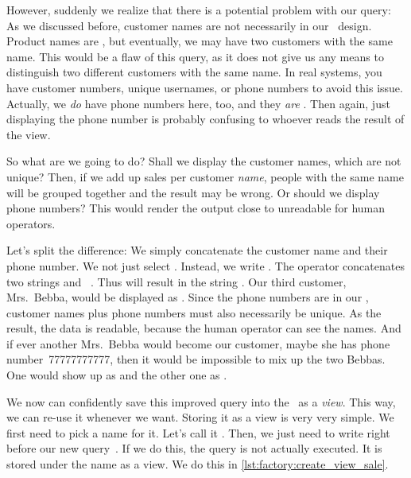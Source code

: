 However, suddenly we realize that there is a potential problem with our query:
As we discussed before, customer names are not necessarily  in our \db\ design.
Product names are , but eventually, we may have two customers with the same name.
This would be a flaw of this query, as it does not give us any means to distinguish two different customers with the same name.
In real systems, you have customer numbers, unique usernames, or phone numbers to avoid this issue.
Actually, we \emph{do} have phone numbers here, too, and they \emph{are} .
Then again, just displaying the phone number is probably confusing to whoever reads the result of the view.

So what are we going to do?
Shall we display the customer names, which are not unique?
Then, if we add up sales per customer \emph{name}, people with the same name will be grouped together and the result may be wrong.
Or should we display phone numbers?
This would render the output close to unreadable for human operators.%
%
\begin{sloppypar}%
Let's split the difference:
We simply concatenate the customer name and their phone number.
We not just select .
Instead, we write .
The \sqlIdx{\textbar\textbar} operator concatenates two strings  and ~\cite{PGDG:PD:SFAO}.
Thus  will result in the string .
Our third customer, Mrs.~Bebba, would be displayed as .
Since the phone numbers are  in our \db, customer names plus phone numbers must also necessarily be unique.
As the result, the data is readable, because the human operator can see the names.
And if ever another Mrs.~Bebba would become our customer, maybe she has phone number~77777777777, then it would be impossible to mix up the two Bebbas.
One would show up as  and the other one as .%
\end{sloppypar}%
%
We now can confidently save this improved query into the \db\ as a \emph{view}.
This way, we can re-use it whenever we want.
Storing it as a view is very very simple.
We first need to pick a name for it.
Let's call it .
Then, we just need to write  right before our new query~\cite{PGDG:PD:CV}.
If we do this, the query is not actually executed.
It is stored under the name  as a view.
We do this in \cref{lst:factory:create_view_sale}.

